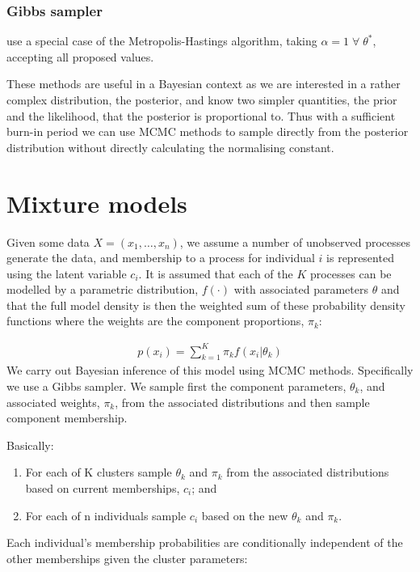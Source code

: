 \documentclass[11pt]{article} %
\begin{document}
\subsubsection{Gibbs sampler}
\citet{GemanStochasticRelaxationGibbs1984} use a special case of the Metropolis-Hastings algorithm, taking $\alpha = 1 \; \forall \; \theta^*$, accepting all proposed values.

These methods are useful in a Bayesian context as we are interested in a rather complex distribution, the posterior, and know two simpler quantities, the prior and the likelihood, that the posterior is proportional to. Thus with a sufficient burn-in period we can use MCMC methods to sample directly from the posterior distribution without directly calculating the normalising constant.

\section{Mixture models} \label{mixture_models}
Given some data $X = (x_1, \ldots, x_n)$, we assume a number of unobserved processes generate the data, and membership to a process for individual $i$ is represented using the latent variable $c_i$. It is assumed that each of the $K$ processes can be modelled by a parametric distribution, $f(\cdot)$ with associated parameters $\theta$ and that the full model density is then the weighted sum of these probability density functions where the weights are the component proportions, $\pi_k$:

\begin{align}
p(x_i) = \sum_{k=1}^K \pi_k f(x_i | \theta_k)
\end{align}
We carry out Bayesian inference of this model using MCMC methods. Specifically we use a Gibbs sampler. We sample first the component parameters, $\theta_k$, and associated weights, $\pi_k$, from the associated distributions and then sample component membership.

Basically:
\begin{enumerate}
 \item For each of K clusters sample $\theta_k$ and $\pi_k$ from the associated distributions based on current memberships, $c_i$; and
 \item For each of n individuals sample $c_i$ based on the new $\theta_k$ and $\pi_k$.
\end{enumerate}
Each individual's membership probabilities are conditionally independent of the other memberships given the cluster parameters:
\end{document}

